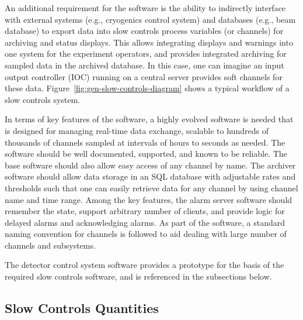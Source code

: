An additional requirement for the software is the ability to indirectly
interface with external systems (e.g., cryogenics control
system) and databases (e.g., beam database) to export data into
slow controls process variables (or channels) for archiving and status
displays. This allows integrating displays and warnings into one
system for the experiment operators, and %
provides integrated
archiving for sampled data in the archived database. In this case, one
can imagine an input output controller (IOC) running on a central 
server provides soft channels for these data.
Figure~\ref{fig:gen-slow-controls-diagram} shows a typical workflow of a
slow controls system.

In terms of key features of the software, a highly evolved software is
needed that is designed for managing real-time data exchange, scalable
to hundreds of thousands of channels sampled at intervals of hours to seconds as needed. The software
should be well documented, supported, and known to be reliable. The base
software should also allow easy access of any channel by name. The
archiver software should allow data storage in an SQL database with
adjustable rates and thresholds such that one can easily retrieve data
for any channel by using channel name and time range. Among the key
features, the alarm server software should remember the state, support
arbitrary number of clients, and provide logic for delayed alarms and
acknowledging alarms. As part of the software, a standard naming
convention for channels is followed to aid dealing with large
number of channels and subsystems.

The  detector control system software \cite{pdspdcs_proc}
provides a prototype for the basis of the required  slow
controls software, and is referenced in the subsections below.

\subsection{Slow Controls Quantities}
\label{sec:fdgen-slow-cryo-quant}


